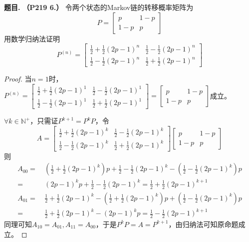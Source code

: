 \documentclass[12pt, a4paper, oneside]{ctexart}
\newcounter{problem}  %
\newenvironment{problem}[1][]{\stepcounter{problem}\par\noindent\textbf{题目\arabic{problem}. #1}}{\smallskip\par}
\def\N{\mathbb{N}}          %
\def\add{\vspace{1ex}}      %
\begin{document}
\begin{problem}\textbf{（P219 6.）}
    令两个状态的Markov链的转移概率矩阵为
    \begin{equation*}
        P = \begin{bmatrix}
            p&1-p\\1-p&p
        \end{bmatrix}
    \end{equation*}
    用数学归纳法证明
    \begin{equation*}
        P^{(n)} = \begin{bmatrix}
            \frac{1}{2}+\frac{1}{2}(2p-1)^n&\frac{1}{2}-\frac{1}{2}(2p-1)^n\\[1em]
            \frac{1}{2}-\frac{1}{2}(2p-1)^n&\frac{1}{2}+\frac{1}{2}(2p-1)^n
        \end{bmatrix}
    \end{equation*}
\end{problem}
\begin{proof}
    当$n=1$时，$P^{(n)} = \begin{bmatrix}
        \frac{1}{2}+\frac{1}{2}(2p-1)^1&\frac{1}{2}-\frac{1}{2}(2p-1)^1\\[1em]
        \frac{1}{2}-\frac{1}{2}(2p-1)^1&\frac{1}{2}+\frac{1}{2}(2p-1)^1
    \end{bmatrix} =
    \begin{bmatrix}
        p&1-p\\1-p&p
    \end{bmatrix}$成立。\add

    $\forall k\in\N^+$，只需证$P^{k+1} = P^{k}P$，令
    \begin{equation*}
        A = \begin{bmatrix}
        \frac{1}{2}+\frac{1}{2}(2p-1)^k&\frac{1}{2}-\frac{1}{2}(2p-1)^k\\[1em]
        \frac{1}{2}-\frac{1}{2}(2p-1)^k&\frac{1}{2}+\frac{1}{2}(2p-1)^k
    \end{bmatrix}
    \begin{bmatrix}
        p&1-p\\1-p&p
    \end{bmatrix}
    \end{equation*}
    则
    \begin{align*}
    A_{00} =&\ \left(\frac{1}{2}+\frac{1}{2}(2p-1)^k\right)p+\frac{1}{2}-\frac{1}{2}(2p-1)^k-\left(\frac{1}{2}-\frac{1}{2}(2p-1)^k\right)p\\
    =&\ (2p-1)^kp+\frac{1}{2}-\frac{1}{2}(2p-1)^k=\frac{1}{2}+\frac{1}{2}(2p-1)^{k+1}
    \end{align*}
    \begin{align*}
    A_{01} =&\ \frac{1}{2}+\frac{1}{2}(2p-1)^k-\left(\frac{1}{2}+\frac{1}{2}(2p-1)^k\right)p+\left(\frac{1}{2}-\frac{1}{2}(2p-1)^k\right)p\\
    =&\ \frac{1}{2}+\frac{1}{2}(2p-1)^k-(2p-1)^kp = \frac{1}{2}-\frac{1}{2}(2p-1)^{k+1}
    \end{align*}
    同理可知$A_{10}=A_{01}, A_{11}=A_{00}$，于是$P^kP = A = P^{k+1}$，由归纳法可知原命题成立。
\end{proof}
\end{document}
